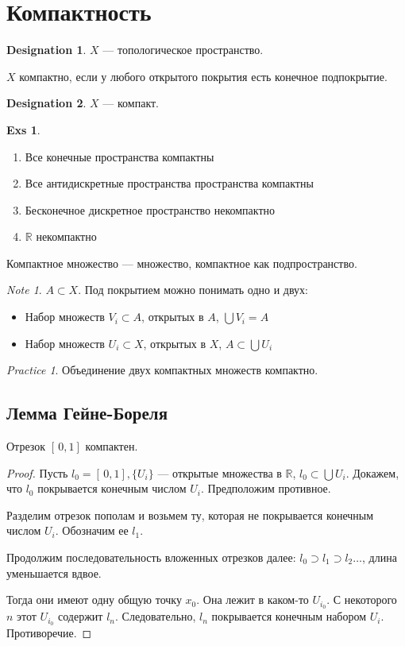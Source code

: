 \documentclass[11pt]{book}
\newcommand{\R}{\mathbb{R}}
\theoremstyle{definition}
\theoremstyle{plain}
\theoremstyle{plain}
\theoremstyle{definition}
\newtheorem*{exs}{Exs}
\newtheorem*{name}{Designation}
\theoremstyle{remark}
\newtheorem*{note}{Note}
\newtheorem*{prac}{Practice}
\begin{document}
\section{Компактность}
\begin{name}
    $ X$ ---  топологическое пространство.
\end{name}
\begin{defn}
    $ X$ компактно, если у любого открытого покрытия есть конечное подпокрытие.
    \begin{name}
	$ X$ --- компакт.
    \end{name}
\end{defn}
\begin{exs}
    $ $
    \begin{enumerate}[noitemsep]
	\item Все конечные пространства компактны
	\item Все антидискретные пространства пространства компактны
	\item Бесконечное дискретное пространство некомпактно
	\item $ \R$ некомпактно
    \end{enumerate}
\end{exs}
\begin{defn}
    Компактное множество --- множество, компактное как подпространство.
\end{defn}
\begin{note}
    $ A \subset X$. Под покрытием можно понимать одно и двух:
    \begin{itemize}
	\item Набор множеств $ V_i \subset A$, открытых в $ A$,  $ \bigcup V_i = A$
	\item Набор множеств $ U_i \subset X$, открытых в $ X$,  $ A \subset \bigcup U_i $
    \end{itemize}
\end{note}
\begin{prac}
    Объединение двух компактных множеств компактно.
\end{prac}
\subsection{Лемма Гейне-Бореля}
\begin{thm}
    Отрезок $ [\,0,1]$ компактен.
\end{thm}
\begin{proof}
    Пусть $ l_0 = [\,0, 1], \{U_i\}$ --- открытые множества в $ \R$, $l_0 \subset  \bigcup U_i$. Докажем, что $ l_0$ покрывается конечным числом $ U_i$. Предположим противное.

    Разделим отрезок пополам и возьмем ту, которая не покрывается конечным числом  $ U_i$. Обозначим ее  $ l_1$.

    Продолжим последовательность вложенных отрезков далее: $ l_0 \supset l_1 \supset l_2 \ldots $, длина уменьшается вдвое.

    Тогда они имеют одну общую точку $ x_0$. Она лежит в каком-то $ U_{i_0}$. С некоторого $ n$ этот  $ U_{i_0}$ содержит $ l_n$. Следовательно,  $ l_n$ покрывается конечным набором  $ U_i$.  Противоречие.
\end{proof}
\end{document}
